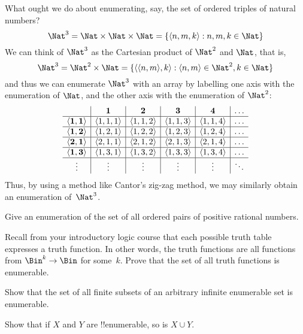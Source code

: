 \documentclass[../../../include/open-logic-section]{subfiles}
\begin{document}
\begin{explain}
What ought we do about enumerating, say, the set of ordered triples
of natural numbers?
\[
\Nat^3 = \Nat \times \Nat \times \Nat = \Setabs{\tuple{n,m,k}}{n,m,k \in \Nat}
\]
We can think of $\Nat^3$ as the Cartesian product of
$\Nat^2$ and $\Nat$, that is,
\[
\Nat^3 = \Nat^2 \times \Nat =
\Setabs{\tuple{\tuple{n,m},k}}{\tuple{n,m} \in \Nat^2, k \in \Nat }
\]
and thus we can enumerate $\Nat^3$ with an array by
labelling one axis with the enumeration of $\Nat$, and the
other axis with the enumeration of $\Nat^2$:
\[
\begin{array}{ c | c | c | c | c | c}
& \textbf 1 & \textbf 2 & \textbf 3 & \textbf 4 & \dots \\
\hline
\mathbf{\tuple{1,1}} & \tuple{1,1,1} & \tuple{1,1,2} & \tuple{1,1,3} & \tuple{1,1,4} & \dots \\
\hline
\mathbf{\tuple{1,2}} & \tuple{1,2,1} & \tuple{1,2,2} & \tuple{1,2,3} & \tuple{1,2,4} & \dots \\
\hline
\mathbf{\tuple{2,1}} & \tuple{2,1,1} & \tuple{2,1,2} & \tuple{2,1,3} & \tuple{2,1,4} & \dots \\
\hline
\mathbf{\tuple{1,3}} & \tuple{1,3,1} & \tuple{1,3,2} & \tuple{1,3,3} & \tuple{1,3,4} & \dots\\
\hline
\vdots & \vdots & \vdots & \vdots & \vdots & \ddots \\
\end{array}
\]
Thus, by using a method like Cantor's zig-zag method, we may
similarly obtain an enumeration of~$\Nat^3$.
\end{explain}

\begin{prob}
Give an enumeration of the set of all ordered pairs of positive
rational numbers.
\end{prob}

\begin{prob}
Recall from your introductory logic course that each possible truth
table expresses a truth function. In other words, the truth functions
are all functions from $\Bin^k \to \Bin$ for some~$k$. Prove that the
set of all truth functions is enumerable.
\end{prob}

\begin{prob}
Show that the set of all finite subsets of an arbitrary infinite
enumerable set is enumerable.
\end{prob}

\begin{prob}
Show that if $X$ and $Y$ are !!{enumerable}, so is $X \cup Y$.
\end{prob}
\end{document}
